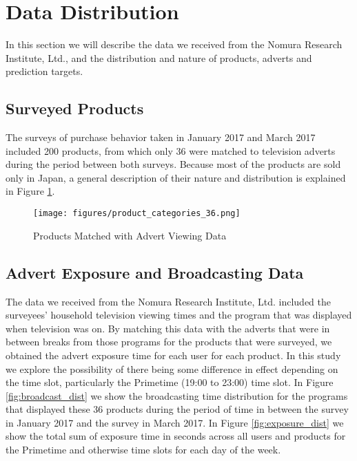 \documentclass[review]{elsarticle}
\begin{document}
\section{Data Distribution}
\label{data_dist}

In this section we will describe the data we received from the Nomura Research Institute, Ltd., and the distribution and nature of products, adverts and prediction targets.

\subsection{Surveyed Products}
\label{product_data}

The surveys of purchase behavior taken in January 2017 and March 2017 included 200 products, from which only 36 were matched to television adverts during the period between both surveys. Because most of the products are sold only in Japan, a general description of their nature and distribution is explained in Figure \ref{fig:product_dist}. 


\begin{figure}[htp]
\centering
\texttt{[image: figures/product\_categories\_36.png]}
\caption{Products Matched with Advert Viewing Data}
\label{fig:product_dist}
\end{figure} 


\subsection{Advert Exposure and Broadcasting Data}
\label{advert_broadcast_dist}

The data we received from the Nomura Research Institute, Ltd. included the surveyees' household television viewing times and the program that was displayed when television was on. By matching this data with the adverts that were in between breaks from those programs for the products that were surveyed, we obtained the advert exposure time for each user for each product. In this study we explore the possibility of there being some difference in effect depending on the time slot, particularly the Primetime (19:00 to 23:00) time slot. In Figure \ref{fig:broadcast_dist} we show the broadcasting time distribution for the programs that displayed these 36 products during the period of time in between the survey in January 2017 and the survey in March 2017. In Figure \ref{fig:exposure_dist} we show the total sum of exposure time in seconds across all users and products for the Primetime and otherwise time slots for each day of the week.
\end{document}
